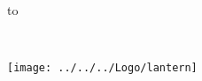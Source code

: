 \begin{titlepage}
\null\vskip-47pt
\hbox to 

\setcounter{page}{1}                      %

\vspace*{60mm}


{\selectfont
\begin{center}
 \\
\end{center}}

\begin{center}
\texttt{[image: ../../../Logo/lantern]}
\end{center}

\vfill
\end{titlepage}

\thispagestyle{empty}
\cleardoublepage

